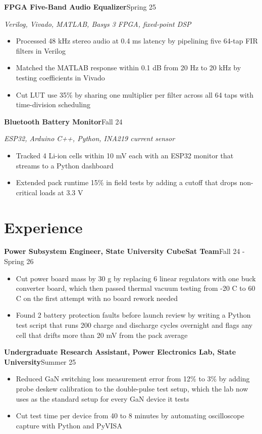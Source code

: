 \documentclass[letterpaper,11pt]{article}
\newlength{\itemgap}           %
\newcommand{\entry}[2]{\textbf{#1}\hfill #2\par}
\newcommand{\skillsused}[1]{\textit{#1}\par}
\begin{document}
\entry{FPGA Five-Band Audio Equalizer}{Spring 25}
\skillsused{Verilog, Vivado, MATLAB, Basys 3 FPGA, fixed-point DSP}
\begin{itemize}
  \item Processed 48 kHz stereo audio at 0.4 ms latency by pipelining five 64-tap FIR filters in Verilog
  \item Matched the MATLAB response within 0.1 dB from 20 Hz to 20 kHz by testing coefficients in Vivado
  \item Cut LUT use 35\% by sharing one multiplier per filter across all 64 taps with time-division scheduling
\end{itemize}
\vspace{\itemgap}

\entry{Bluetooth Battery Monitor}{Fall 24}
\skillsused{ESP32, Arduino C++, Python, INA219 current sensor}
\begin{itemize}
  \item Tracked 4 Li-ion cells within 10 mV each with an ESP32 monitor that streams to a Python dashboard
  \item Extended pack runtime 15\% in field tests by adding a cutoff that drops non-critical loads at 3.3 V
\end{itemize}

\section{Experience}

\entry{Power Subsystem Engineer, State University CubeSat Team}{Fall 24 - Spring 26}
\begin{itemize}
  \item Cut power board mass by 30 g by replacing 6 linear regulators with one buck converter board, which then passed thermal vacuum testing from -20 \textdegree{}C to 60 \textdegree{}C on the first attempt with no board rework needed
  \item Found 2 battery protection faults before launch review by writing a Python test script that runs 200 charge and discharge cycles overnight and flags any cell that drifts more than 20 mV from the pack average
\end{itemize}
\vspace{\itemgap}

\entry{Undergraduate Research Assistant, Power Electronics Lab, State University}{Summer 25}
\begin{itemize}
  \item Reduced GaN switching loss measurement error from 12\% to 3\% by adding probe deskew calibration to the double-pulse test setup, which the lab now uses as the standard setup for every GaN device it tests
  \item Cut test time per device from 40 to 8 minutes by automating oscilloscope capture with Python and PyVISA
\end{itemize}
\end{document}
